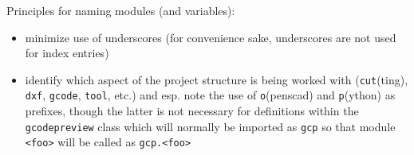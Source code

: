 \documentclass{ltxdoc}
\begin{document}
%
%
%
%
%
%
%
%
%
%
%
%
%
%
%
%
%
%
%

Principles for naming modules (and variables):

\begin{itemize}
\item minimize use of underscores (for convenience sake, underscores are not used for index entries)
\item identify which aspect of the project structure is being worked with (\texttt{cut}(ting), 
      \texttt{dxf}, \texttt{gcode}, \texttt{tool}, etc.) and esp. note the use of
      \texttt{o}(penscad) and \texttt{p}(ython) as prefixes, though the latter is 
      not necessary for definitions within the \verb|gcodepreview| class which will 
      normally be imported as \verb|gcp| so that module \verb|<foo>| will be called as
      \verb|gcp.<foo>|
\end{itemize}
\end{document}
